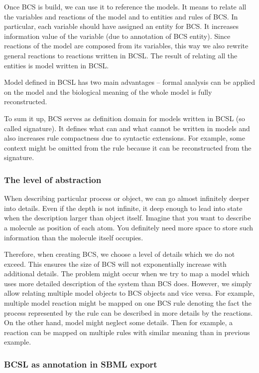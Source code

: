 \documentclass[12pt]{fithesis2}
\begin{document}
Once BCS is build, we can use it to reference the models. It means to relate all the variables and reactions of the model and to entities and rules of BCS. In particular, each variable should have assigned an entity for BCS. It increases information value of the variable (due to annotation of BCS entity). Since reactions of the model are composed from its variables, this way we also rewrite general reactions to reactions written in BCSL. The result of relating all the entities is model written in BCSL. 

Model defined in BCSL has two main advantages -- formal analysis can be applied on the model and the biological meaning of the whole model is fully reconstructed.

To sum it up, BCS serves as definition domain for models written in BCSL (so called signature). It defines what can and what cannot be written in models and also increases rule compactness due to syntactic extensions. For example, some context might be omitted from the rule because it can be reconstructed from the signature.

\subsubsection{The level of abstraction}
\label{level_of_abstraction}

When describing particular process or object, we can go almost infinitely deeper into details. Even if the depth is not infinite, it deep enough to lead into state when the description larger than object itself. Imagine that you want to describe a molecule as position of each atom. You definitely need more space to store such information than the molecule itself occupies.

Therefore, when creating BCS, we choose a level of details which we do not exceed. This ensures the size of BCS will not exponentially increase with additional details. The problem might occur when we try to map a model which uses more detailed description of the system than BCS does. However, we simply allow relating multiple model objects to BCS objects and vice versa. For example, multiple model reaction might be mapped on one BCS rule denoting the fact the process represented by the rule can be described in more details by the reactions. On the other hand, model might neglect some details. Then for example, a reaction can be mapped on multiple rules with similar meaning than in previous example.

\subsubsection{BCSL as annotation in SBML export}
\end{document}

